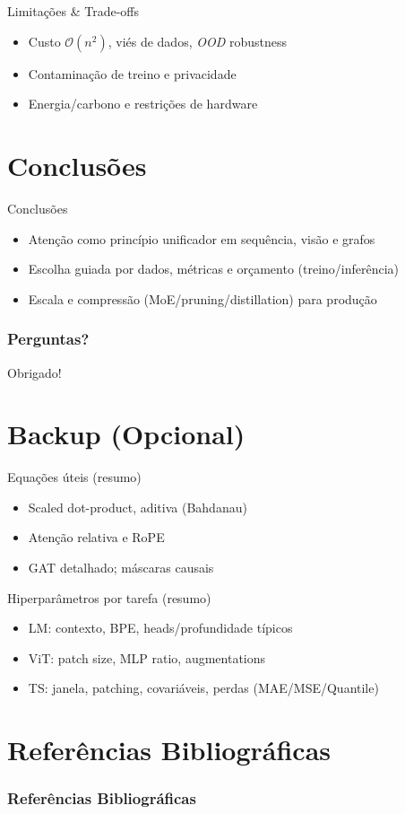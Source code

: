 \documentclass{beamer}
\begin{document}
\begin{frame}{Limitações \& Trade-offs}
\begin{itemize}[<+->]
  \item Custo $\mathcal{O}(n^2)$, viés de dados, \textit{OOD} robustness
  \item Contaminação de treino e privacidade
  \item Energia/carbono e restrições de hardware
\end{itemize}
\end{frame}

\section{Conclusões}
\begin{frame}{Conclusões}
\begin{itemize}[<+->]
  \item Atenção como princípio unificador em sequência, visão e grafos
  \item Escolha guiada por dados, métricas e orçamento (treino/inferência)
  \item Escala e compressão (MoE/pruning/distillation) para produção
\end{itemize}
\end{frame}

\backmatter
\begin{frame}
\frametitle{Perguntas?}
\centering
Obrigado!
\end{frame}

\section{Backup (Opcional)}
\begin{frame}{Equações úteis (resumo)}
\small
\begin{itemize}
  \item Scaled dot-product, aditiva (Bahdanau)
  \item Atenção relativa e RoPE
  \item GAT detalhado; máscaras causais
\end{itemize}
\end{frame}

\begin{frame}{Hiperparâmetros por tarefa (resumo)}
\small
\begin{itemize}
  \item LM: contexto, BPE, heads/profundidade típicos
  \item ViT: patch size, MLP ratio, augmentations
  \item TS: janela, patching, covariáveis, perdas (MAE/MSE/Quantile)
\end{itemize}
\end{frame}

\section{Referências Bibliográficas} 
\begin{frame}[allowframebreaks]
  \frametitle{Referências Bibliográficas} 
  
  
\end{frame}
\end{document}
